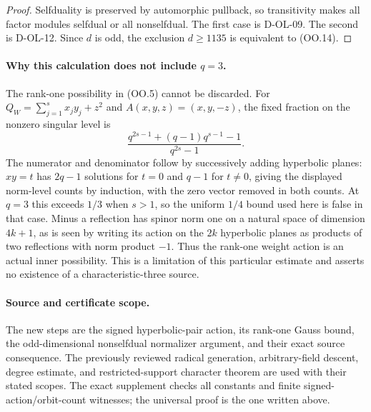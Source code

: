 \begin{proof}
Selfduality is preserved by automorphic pullback, so transitivity
makes all factor modules selfdual or all nonselfdual.  The first
case is D-OL-09.  The second is D-OL-12.  Since $d$ is odd,
the exclusion $d\ge1135$ is equivalent to (OO.14).
\end{proof}

\paragraph{Why this calculation does not include $q=3$.}
The rank-one possibility in (OO.5) cannot be discarded.  For
$Q_W=\sum_{j=1}^s x_jy_j+z^2$ and $A(x,y,z)=(x,y,-z)$,
the fixed fraction on the nonzero singular level is
\[
 \frac{q^{2s-1}+(q-1)q^{s-1}-1}{q^{2s}-1}.                  \tag{OO.15}
\]
The numerator and denominator follow by successively adding
hyperbolic planes: $xy=t$ has $2q-1$ solutions for $t=0$ and
$q-1$ for $t\ne0$, giving the displayed norm-level counts by
induction, with the zero vector removed in both counts.
At $q=3$ this exceeds $1/3$ when $s>1$, so the uniform
$1/4$ bound used here is false in that case.  Minus a reflection
has spinor norm one on a natural space of dimension $4k+1$,
as is seen by writing its action on the $2k$ hyperbolic planes
as products of two reflections with norm product $-1$.
Thus the rank-one weight action is an actual inner possibility.
This is a limitation of this particular estimate and asserts
no existence of a characteristic-three source.

\paragraph{Source and certificate scope.}
The new steps are the signed hyperbolic-pair action, its rank-one
Gauss bound, the odd-dimensional nonselfdual normalizer argument,
and their exact source consequence.  The previously reviewed
radical generation, arbitrary-field descent, degree estimate,
and restricted-support character theorem are used with their
stated scopes.  The exact supplement checks all constants and
finite signed-action/orbit-count witnesses; the universal proof
is the one written above.
